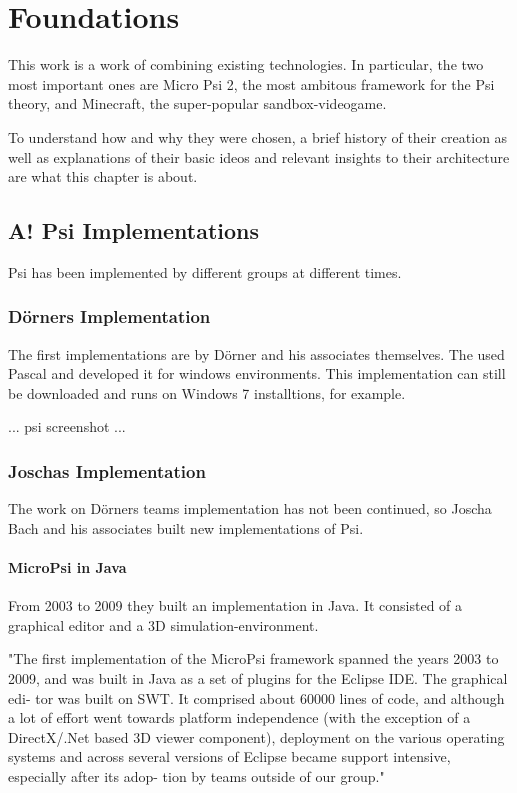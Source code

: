 \chapter{Foundations}
This work is a work of combining existing technologies. In particular, the two most important ones are Micro Psi 2, the most ambitous framework for the Psi theory, and Minecraft, the super-popular sandbox-videogame.

To understand how and why they were chosen, a brief history of their creation as well as explanations of their basic ideos and relevant insights to their architecture are what this chapter is about.

    \section{A! Psi Implementations}
Psi has been implemented by different groups at different times.

        \subsection{Dörners Implementation}
The first implementations are by Dörner and his associates themselves. The used Pascal and developed it for windows environments. This implementation can still be downloaded and runs on Windows 7 installtions, for example.

... psi screenshot ...


        \subsection{Joschas Implementation}
The work on Dörners teams implementation has not been continued, so Joscha Bach and his associates built new implementations of Psi.

            \subsubsection{MicroPsi in Java}
From 2003 to 2009 they built an implementation in Java. It consisted of a graphical editor and a 3D simulation-environment.~\cite{conf/agi/Bach12}  

"The first implementation of the MicroPsi framework spanned the years 2003 to 2009, and was built in Java as a set of plugins for the Eclipse IDE. The graphical edi- tor was built on SWT. It comprised about 60000 lines of code, and although a lot of effort went towards platform independence (with the exception of a DirectX/.Net based 3D viewer component), deployment on the various operating systems and across several versions of Eclipse became support intensive, especially after its adop- tion by teams outside of our group."~\cite{conf/agi/Bach12}

